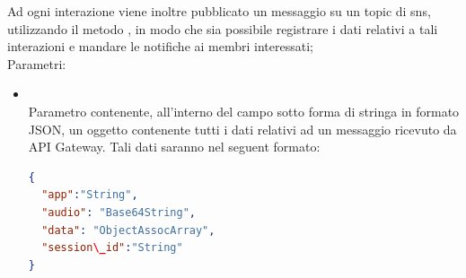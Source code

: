 \begin{itemize}
\begin{itemize}
Ad ogni interazione viene inoltre pubblicato un messaggio su un topic di sns, utilizzando il metodo , in modo che sia possibile registrare i dati relativi a tali interazioni e mandare le notifiche ai membri interessati;\\
		Parametri:
		\begin{itemize}
			\item {} \\
			Parametro contenente, all'interno del campo  sotto forma di stringa in formato JSON, un oggetto contenente tutti i dati relativi ad un messaggio ricevuto da API Gateway. Tali dati saranno nel seguent formato:
\begin{lstlisting}[language=json,firstnumber=1]
{
  "app":"String",
  "audio": "Base64String",
  "data": "ObjectAssocArray",
  "session\_id":"String"
}
\end{lstlisting}


\end{itemize}
\end{itemize}
\end{itemize}
